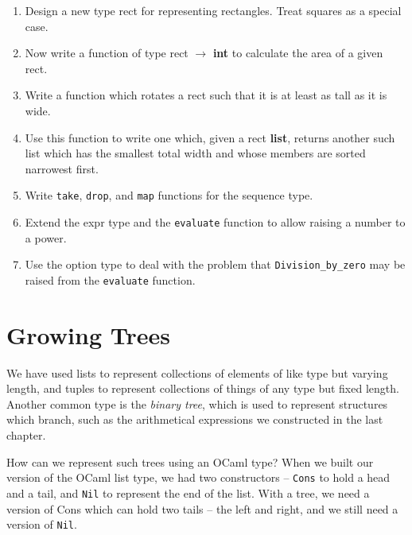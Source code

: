 \documentclass[]{book}
\begin{document}
\begin{enumerate}
  \item Design a new type \textsf{rect} for representing rectangles. Treat squares as a special case.
  \item Now write a function of type \textsf{rect $\rightarrow$ \textbf{int}} to calculate the area of a given \textsf{rect}.
  \item Write a function which rotates a \textsf{rect} such that it is at least as tall as it is wide.
  \item Use this function to write one which, given a \textsf{rect \textbf{list}}, returns another such list which has the smallest total width and whose members are sorted narrowest first.
  \item Write \texttt{take}, \texttt{drop}, and \texttt{map} functions for the \textsf{sequence} type.
  \item Extend the \textsf{expr} type and the \texttt{evaluate} function to allow raising a number to a power.
  \item Use the \textsf{option} type to deal with the problem that \texttt{Division\_by\_zero} may be raised from the \texttt{evaluate} function.
\end{enumerate}

\cleardoublepage
\thispagestyle{empty}

\pagestyle{empty}


\chapter{Growing Trees}
\pagestyle{fancy}

We have used lists to represent collections of elements of like type but varying length, and tuples to represent collections of things of any type but fixed length. Another common type is the \textit{binary tree}, which is used to represent structures which branch, such as the arithmetical expressions we constructed in the last chapter.

How can we represent such trees using an OCaml type? When we built our version of the OCaml list type, we had two constructors -- \texttt{Cons} to hold a head and a tail, and \texttt{Nil} to represent the end of the list. With a tree, we need a version of Cons which can hold two tails -- the left and right, and we still need a version of \texttt{Nil}.
\end{document}
